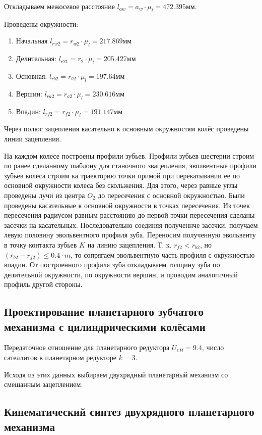 Откладываем межосевое расстояние $l_{aw} = a_w \cdot \mu_l = 472.395 мм$. 

Проведены окружности:

\begin{enumerate}
	\item Начальная $l_{rw2} = r_{w2} \cdot \mu_l = 217.869 мм$
	\item Делительная: $l_{r21} = r_2 \cdot \mu_l = 205.427 мм$
	\item Основная: $l_{rb2} = r_{b2} \cdot \mu_l = 197.64 мм$
	\item Вершин: $l_{ra2} = r_{a2} \cdot \mu_l = 230.616 мм$
	\item Впадин: $l_{rf2} = r_{f2} \cdot \mu_l = 191.147 мм$
\end{enumerate}

Через полюс зацепления касательно к основным окружностям колёс проведены линии зацепления.

На каждом колесе построены профили зубьев. Профили зубьев шестерни строим по ранее сделанному шаблону для станочного звацепления, эволвентные профили зубьев колеса строим ка траекторию точки примой при перекатывании ее по основной окружности колеса без скольжения. Для этого, через равные углы проведены лучи из центра $O_2$ до пересечения с основной окружностью. Были проведены касательные к основной окружности в точках пересечения. Из точек пересечения радиусом равным расстоянию до первой точки пересечения сделаны засечки на касательных. Последовательно соединяя полученнче засечки, получаем левую половину эвольвентного профиля зуба. Переносим полученную эвольвенту в точку контакта зубьев $K$ на линию зацепления. Т. к. $r_{f2} < r_{b2}$, но $ (r_{b2} - r_{f2}) \leqslant 0.4 \cdot m $, то сопрягаем эвольвентную часть профиля с окружностью впадин. От построенного профиля зуба откладываем толщину зуба по делительной окружности, по окружности вершин, и проводим аналогичный профиль другой стороны.

\subsection{Проектирование планетарного зубчатого механизма с цилиндрическими колёсами}

Передаточное отношение для планетарного редуктора $U_{1H} = 9.4$, число сателлитов в планетарном редукторе $k = 3$.

Исходя из этих данных выбираем двухрядный планетарный механизм со смешанным зацеплением.

\subsection{Кинематический синтез двухрядного планетарного механизма}

